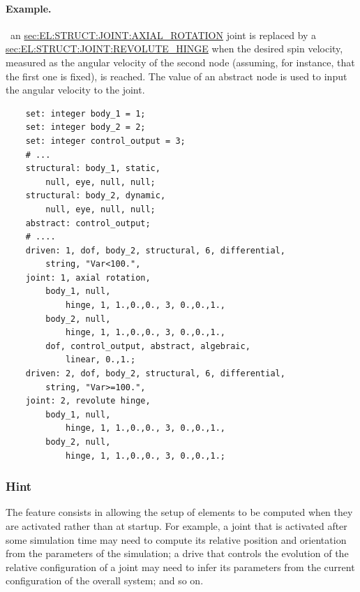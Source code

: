 \paragraph{Example.} \
an
\hyperref{\kw{axial rotation}}{\kw{axial rotation} (see Section~}{)}{sec:EL:STRUCT:JOINT:AXIAL_ROTATION}
joint is replaced by a
\hyperref{\kw{revolute hinge}}{\kw{revolute hinge} (see Section~}{)}{sec:EL:STRUCT:JOINT:REVOLUTE_HINGE}
when the desired spin velocity, measured as the angular velocity
of the second node (assuming, for instance, that the first one is fixed),
is reached.
The value of an abstract node is used to input the angular velocity 
to the \kw{axial rotation} joint.
\begin{verbatim}
    set: integer body_1 = 1;
    set: integer body_2 = 2;
    set: integer control_output = 3;
    # ...
    structural: body_1, static,
        null, eye, null, null;
    structural: body_2, dynamic,
        null, eye, null, null;
    abstract: control_output;
    # ....
    driven: 1, dof, body_2, structural, 6, differential,
        string, "Var<100.",
    joint: 1, axial rotation,
        body_1, null,
            hinge, 1, 1.,0.,0., 3, 0.,0.,1.,
        body_2, null,
            hinge, 1, 1.,0.,0., 3, 0.,0.,1.,
        dof, control_output, abstract, algebraic,
            linear, 0.,1.;
    driven: 2, dof, body_2, structural, 6, differential,
        string, "Var>=100.",
    joint: 2, revolute hinge,
        body_1, null,
            hinge, 1, 1.,0.,0., 3, 0.,0.,1.,
        body_2, null,
            hinge, 1, 1.,0.,0., 3, 0.,0.,1.;
\end{verbatim}

\subsubsection{Hint}
The  feature consists in allowing the setup of elements
to be computed when they are activated rather than at startup.
For example, a joint that is activated after some simulation time
may need to compute its relative position and orientation
from the parameters of the simulation; a drive that controls
the evolution of the relative configuration of a joint may need
to infer its parameters from the current configuration
of the overall system; and so on.

